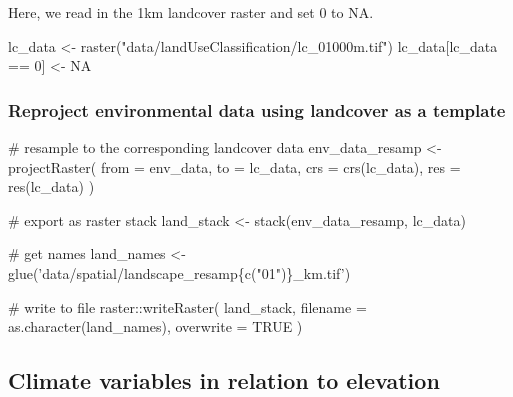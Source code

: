\documentclass[
]{article}
\newenvironment{Shaded}{}{}
\newcommand{\CommentTok}[1]{\textcolor[rgb]{0.00,0.50,0.00}{#1}}
\newcommand{\DataTypeTok}[1]{#1}
\newcommand{\DecValTok}[1]{#1}
\newcommand{\KeywordTok}[1]{\textcolor[rgb]{0.00,0.00,1.00}{#1}}
\newcommand{\NormalTok}[1]{#1}
\newcommand{\OperatorTok}[1]{#1}
\newcommand{\OtherTok}[1]{\textcolor[rgb]{1.00,0.25,0.00}{#1}}
\newcommand{\StringTok}[1]{\textcolor[rgb]{0.00,0.50,0.50}{#1}}
\begin{document}
Here, we read in the 1km landcover raster and set 0 to NA.

\begin{Shaded}
\begin{Highlighting}[]
\NormalTok{lc_data <-}\StringTok{ }\KeywordTok{raster}\NormalTok{(}\StringTok{"data/landUseClassification/lc_01000m.tif"}\NormalTok{)}
\NormalTok{lc_data[lc_data }\OperatorTok{==}\StringTok{ }\DecValTok{0}\NormalTok{] <-}\StringTok{ }\OtherTok{NA}
\end{Highlighting}
\end{Shaded}

\hypertarget{reproject-environmental-data-using-landcover-as-a-template}{%
\subsubsection{Reproject environmental data using landcover as a template}\label{reproject-environmental-data-using-landcover-as-a-template}}

\begin{Shaded}
\begin{Highlighting}[]
\CommentTok{# resample to the corresponding landcover data}
\NormalTok{env_data_resamp <-}\StringTok{ }\KeywordTok{projectRaster}\NormalTok{(}
  \DataTypeTok{from =}\NormalTok{ env_data, }\DataTypeTok{to =}\NormalTok{ lc_data,}
  \DataTypeTok{crs =} \KeywordTok{crs}\NormalTok{(lc_data), }\DataTypeTok{res =} \KeywordTok{res}\NormalTok{(lc_data)}
\NormalTok{)}

\CommentTok{# export as raster stack}
\NormalTok{land_stack <-}\StringTok{ }\KeywordTok{stack}\NormalTok{(env_data_resamp, lc_data)}

\CommentTok{# get names}
\NormalTok{land_names <-}\StringTok{ }\KeywordTok{glue}\NormalTok{(}\StringTok{'data/spatial/landscape_resamp\{c("01")\}_km.tif'}\NormalTok{)}

\CommentTok{# write to file}
\NormalTok{raster}\OperatorTok{::}\KeywordTok{writeRaster}\NormalTok{(}
\NormalTok{  land_stack, }\DataTypeTok{filename =} \KeywordTok{as.character}\NormalTok{(land_names), }
  \DataTypeTok{overwrite =} \OtherTok{TRUE}
\NormalTok{)}
\end{Highlighting}
\end{Shaded}

\hypertarget{climate-variables-in-relation-to-elevation}{%
\subsection{Climate variables in relation to elevation}\label{climate-variables-in-relation-to-elevation}}
\end{document}
